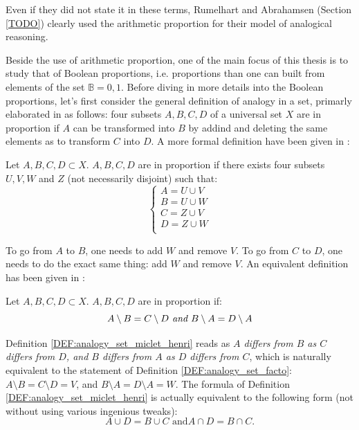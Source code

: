 Even if they did not state it in these terms, Rumelhart and Abrahamsen (Section
\ref{TODO}) clearly used the arithmetic proportion for their model of
analogical reasoning.

Beside the use of arithmetic proportion, one of the main focus of this thesis
is to study that of Boolean proportions, i.e.  proportions than one can built
from elements of the set $\mathbb{B} = {0, 1}$. Before diving in more details
into the Boolean proportions, let's first consider the general definition of
analogy in a set, primarly elaborated in \cite{Lep03} as follows: four subsets
$A, B, C, D$ of a universal set $X$ are in proportion if $A$ can be transformed
into $B$ by addind and deleting the same elements as to transform $C$ into $D$.
A more formal definition have been given in \cite{StrYvoREPORT05}:

\begin{definition}
  \label{DEF:analogy_set_facto}
  Let $A, B, C, D \subset X$. $A, B, C, D$ are in proportion if there exists
  four subsets $U, V, W$ and $Z$ (not necessarily disjoint) such that:
  $$
  \begin{cases}
    A = U \cup V\\
    B = U \cup W\\
    C = Z \cup V\\
    D = Z \cup W\\
  \end{cases}
  $$
\end{definition}

To go from $A$ to $B$, one needs to add $W$ and remove $V$. To go from $C$ to
$D$, one needs to do the exact same thing: add $W$ and remove $V$. An
equivalent definition has been given in \cite{MicPra09}:

\begin{definition}
  \label{DEF:analogy_set_miclet_henri}
  Let $A, B, C, D \subset X$. $A, B, C, D$ are in proportion if:
  $$
  A \setminus B = C \setminus D \emph{ and } B \setminus A = D \setminus A
  $$
\end{definition}

Definition \ref{DEF:analogy_set_miclet_henri} reads as \textit{$A$ differs from
$B$ as $C$ differs from $D$, and $B$ differs from $A$ as $D$ differs from $C$},
which is naturally equivalent to the statement of Definition
\ref{DEF:analogy_set_facto}: $A \setminus B = C \setminus D = V$, and $B
\setminus A = D \setminus A  = W$. The formula of Definition
\ref{DEF:analogy_set_miclet_henri} is actually equivalent to the following form
(not without using various ingenious tweaks): $$A \cup D = B \cup C \text{ and
} A \cap D = B \cap C.$$

